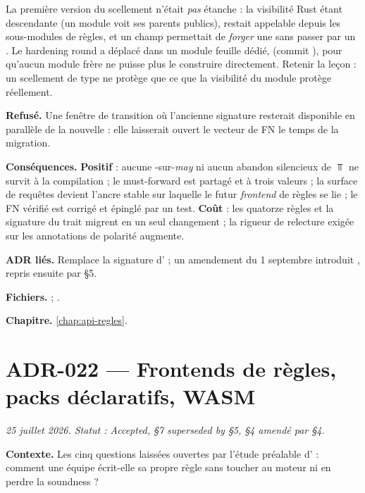 \begin{piege}
La première version du scellement n'était \emph{pas} étanche : la visibilité
Rust étant descendante (un module voit ses parents publics), 
restait appelable depuis les sous-modules de règles, et un champ
 permettait de \emph{forger} une  sans passer
par un . Le \og hardening round\fg{} a déplacé
 dans un module feuille dédié, 
(commit ), pour qu'aucun module frère ne puisse plus le
construire directement. Retenir la leçon : un scellement de type ne protège
que ce que la visibilité du module protège réellement.
\end{piege}

\textbf{Refusé.} Une fenêtre de transition où l'ancienne signature
 resterait disponible en parallèle de
la nouvelle : elle laisserait ouvert le vecteur de FN le temps de la
migration.

\textbf{Conséquences.} \textbf{Positif} : aucune -sur-\emph{may} ni
aucun abandon silencieux de $\Top$ ne survit à la compilation ; le
must-forward est partagé et à trois valeurs ; la surface de requêtes devient
l'ancre stable sur laquelle le futur \emph{frontend} de règles se lie ; le FN
vérifié est corrigé et épinglé par un test. \textbf{Coût} : les quatorze
règles et la signature du trait migrent en un seul changement ; la rigueur de
relecture exigée sur les annotations de polarité augmente.

\textbf{ADR liés.} Remplace la signature d' ; un amendement du 1{\ier}
septembre introduit , repris ensuite par  §5.

\textbf{Fichiers.}  ; .

\textbf{Chapitre.} \cref{chap:api-regles}.

\section{ADR-022 --- Frontends de règles, packs déclaratifs, WASM}
\label{adr:22}
\noindent\textit{25 juillet 2026. Statut : Accepted, §7 superseded by  §5, §4 amendé par  §4.}

\textbf{Contexte.} Les cinq questions laissées ouvertes par l'étude
préalable d' : comment une équipe écrit-elle sa propre règle sans
toucher au moteur ni en perdre la soundness ?

